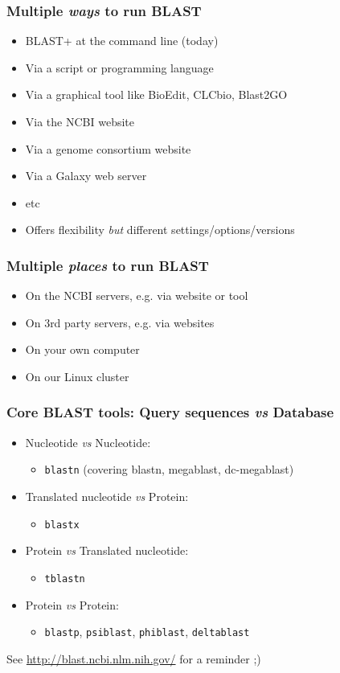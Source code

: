 \begin{frame}
  \frametitle{Multiple \textit{ways} to run BLAST}
  \begin{itemize}
    \item BLAST+ at the command line (today)
    \item Via a script or programming language
    \item Via a graphical tool like BioEdit, CLCbio, Blast2GO
    \item Via the NCBI website
    \item Via a genome consortium website
    \item Via a Galaxy web server
    \item etc
    \item Offers flexibility \textit{but} different settings/options/versions
  \end{itemize}
\end{frame}

\begin{frame}
  \frametitle{Multiple \textit{places} to run BLAST}
  \begin{itemize}
    \item On the NCBI servers, e.g. via website or tool
    \item On 3rd party servers, e.g. via websites
    \item On your own computer
    \item On our Linux cluster
  \end{itemize}
\end{frame}

\begin{frame}
  \frametitle{Core BLAST tools: Query sequences \textit{vs} Database}
  \begin{itemize}
    \item Nucleotide \textit{vs} Nucleotide:
    \begin{itemize}
      \item \texttt{blastn} (covering blastn, megablast, dc-megablast)
    \end{itemize}
    \item Translated nucleotide \textit{vs} Protein:
    \begin{itemize}
      \item \texttt{blastx}
    \end{itemize}
    \item Protein \textit{vs} Translated nucleotide:
    \begin{itemize}
      \item \texttt{tblastn}
    \end{itemize}
    \item Protein \textit{vs} Protein:
    \begin{itemize}
      \item \texttt{blastp}, \texttt{psiblast}, \texttt{phiblast}, \texttt{deltablast}
    \end{itemize}
  \end{itemize}
  See \url{http://blast.ncbi.nlm.nih.gov/} for a reminder ;)
\end{frame}
